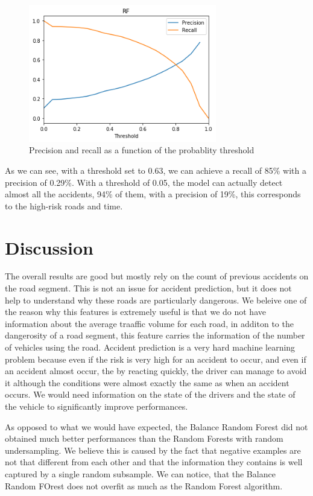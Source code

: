 \documentclass[conference]{IEEEtran}
\begin{document}
\begin{figure}[htbp]
\centerline{\includegraphics[height=6cm, keepaspectratio]{figures/pr.png}}
\caption{Precision and recall as a function of the probablity threshold}
\label{precision recall}
\end{figure}

As we can see, with a threshold set to 0.63, we can achieve a recall of 85\% with a precision of 0.29\%.
With a threshold of 0.05, the model can actually detect almost all the accidents, 94\% of them, with a precision of 19\%, this corresponds to the high-risk roads and time.

\section{Discussion}
The overall results are good but mostly rely on the count of previous accidents on the road segment.
This is not an issue for accident prediction, but it does not help to understand why these roads are particularly dangerous.
We beleive one of the reason why this features is extremely useful is that we do not have information about the average traaffic volume for each road, in additon to the dangerosity of a road segment, this feature carries the information of the number of vehicles using the road.
Accident prediction is a very hard machine learning problem because even if the risk is very high for an accident to occur, and even if an accident almost occur, the by reacting quickly, the driver can manage to avoid it although the conditions were almost exactly the same as when an accident occurs.
We would need information on the state of the drivers and the state of the vehicle to significantly improve performances.

As opposed to what we would have expected, the Balance Random Forest did not obtained much better performances than the Random Forests with random undersampling.
We believe this is caused by the fact that negative examples are not that different from each other and that the information they contains is well captured by a single random subsample.
We can notice, that the Balance Random FOrest does not overfit as much as the Random Forest algorithm.
\end{document}

